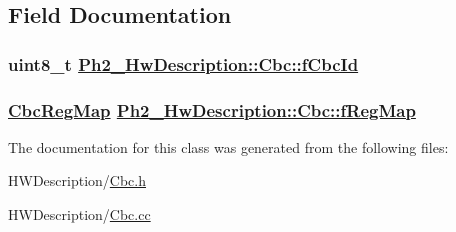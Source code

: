 \subsection{Field Documentation}
\hypertarget{class_ph2___hw_description_1_1_cbc_99b392306d4cdb7ffa7f956fc553011c}{
\subsubsection[fCbcId]{\setlength{\rightskip}{0pt plus 5cm}uint8\_\-t \hyperlink{class_ph2___hw_description_1_1_cbc_99b392306d4cdb7ffa7f956fc553011c}{Ph2\_\-Hw\-Description::Cbc::f\-Cbc\-Id}}}
\label{class_ph2___hw_description_1_1_cbc_99b392306d4cdb7ffa7f956fc553011c}


\hypertarget{class_ph2___hw_description_1_1_cbc_b4dbf1af172e821d95f77acb7e4fb962}{
\subsubsection[fRegMap]{\setlength{\rightskip}{0pt plus 5cm}\hyperlink{namespace_ph2___hw_description_9a23b373068f169aa67ca1d22c9a6001}{Cbc\-Reg\-Map} \hyperlink{class_ph2___hw_description_1_1_cbc_b4dbf1af172e821d95f77acb7e4fb962}{Ph2\_\-Hw\-Description::Cbc::f\-Reg\-Map}}}
\label{class_ph2___hw_description_1_1_cbc_b4dbf1af172e821d95f77acb7e4fb962}




The documentation for this class was generated from the following files:\begin{CompactItemize}
\item 
HWDescription/\hyperlink{_cbc_8h}{Cbc.h}\item 
HWDescription/\hyperlink{_cbc_8cc}{Cbc.cc}\end{CompactItemize}
